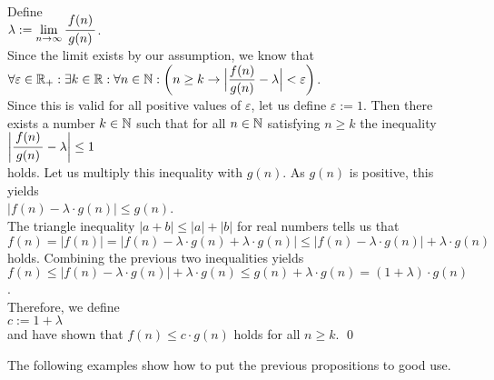 \proof
Define \\[0.2cm]
\hspace*{1.3cm}
$\lambda := \lim\limits_{n \rightarrow \infty} \bruch{f(n)}{g(n)}$.  
\\[0.2cm]
Since the limit exists by our assumption, we know that
\\[0.2cm]
\hspace*{1.3cm}
$\displaystyle\forall \varepsilon \in \mathbb{R}_+:\exists k \in \mathbb{R}: \forall n \in \mathbb{N}: 
 \biggl(n \geq k \rightarrow \Bigl| \frac{f(n)}{g(n)} - \lambda \Bigr| < \varepsilon \biggr)
$.
\\[0.2cm]
Since this is valid for all positive values of $\varepsilon$, let us define $\varepsilon := 1$. 
Then there exists a number $k \in {\mathbb N}$ such that
for all $n\in {\mathbb N}$ satisfying $n \geq k$ the inequality 
\\[0.2cm]
\hspace*{1.3cm}
$\left| \bruch{f(n)}{g(n)} - \lambda \right| \leq 1$ 
\\[0.2cm]
holds.  Let us multiply this inequality with $g(n)$.  As $g(n)$ is positive, this yields
\\[0.2cm]
\hspace*{1.3cm}
$|f(n) - \lambda \cdot g(n)| \leq g(n)$. 
\\[0.2cm]
The triangle inequality $|a + b| \leq |a| + |b|$ for real numbers tells us that 
\\[0.2cm]
\hspace*{1.3cm}
$f(n) =    \bigl|f(n)\bigr|
      =    \bigl|f(n) - \lambda \cdot g(n) + \lambda \cdot g(n)\bigr|
      \leq \bigl|f(n) - \lambda \cdot g(n)\bigr| + \lambda \cdot g(n)$ 
\\[0.2cm]
holds.  Combining the previous two inequalities yields
\\[0.2cm]
\hspace*{1.3cm}
$f(n) \leq \bigl|f(n) - \lambda \cdot g(n)\bigr| + \lambda \cdot g(n)
      \leq g(n) + \lambda \cdot g(n)
       =   (1 + \lambda) \cdot g(n)
$.
\\[0.2cm]
Therefore, we define
\\[0.2cm]
\hspace*{1.3cm}
 $c := 1 +  \lambda$
\\[0.2cm] 
and have shown that $f(n) \leq c \cdot g(n)$ holds for all $n \geq k$. \qed
\vspace*{0.3cm}

\noindent
The following examples show how to put the previous propositions to good use.

